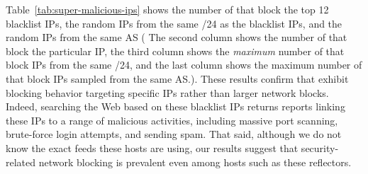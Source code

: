 Table~\ref{tab:super-malicious-ips} shows the number of {}
that block the top 12 blacklist IPs, the random IPs from the same
/24 as the blacklist IPs, and the random IPs from the same AS ( The second column shows the number of {}
  that block the particular IP, the third column shows the
  \textit{maximum} number of {} that block IPs from the
  same /24, and the last column shows the maximum number of
  {} that block IPs sampled from the same AS.). 
These
results confirm that {} exhibit blocking behavior targeting
specific IPs rather than larger network blocks.  Indeed, searching the
Web based on these blacklist IPs returns reports linking these IPs to
a range of malicious activities, including massive port scanning,
brute-force login attempts, and sending spam. That said, although we do
not know the exact feeds these hosts are using, our results suggest
that security-related network blocking is prevalent even among hosts
such as these reflectors.
